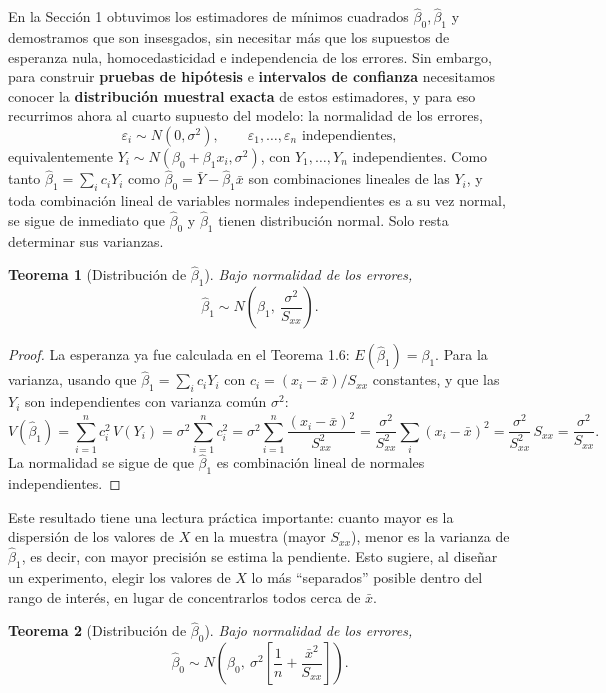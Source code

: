 \documentclass[11pt,a4paper]{article}
\theoremstyle{plain}
\newtheorem{teorema}{Teorema}[section]
\theoremstyle{definition}
\theoremstyle{remark}
\begin{document}
En la Sección 1 obtuvimos los estimadores de mínimos cuadrados $\hat\beta_0,\hat\beta_1$ y demostramos que son insesgados, sin necesitar más que los supuestos de esperanza nula, homocedasticidad e independencia de los errores. Sin embargo, para construir \textbf{pruebas de hipótesis} e \textbf{intervalos de confianza} necesitamos conocer la \textbf{distribución muestral exacta} de estos estimadores, y para eso recurrimos ahora al cuarto supuesto del modelo: la normalidad de los errores,
\[
\varepsilon_i \sim N(0,\sigma^2), \qquad \varepsilon_1,\dots,\varepsilon_n \text{ independientes},
\]
equivalentemente $Y_i\sim N(\beta_0+\beta_1x_i,\sigma^2)$, con $Y_1,\dots,Y_n$ independientes. Como tanto $\hat\beta_1=\sum_ic_iY_i$ como $\hat\beta_0=\bar Y-\hat\beta_1\bar x$ son combinaciones lineales de las $Y_i$, y toda combinación lineal de variables normales independientes es a su vez normal, se sigue de inmediato que $\hat\beta_0$ y $\hat\beta_1$ tienen distribución normal. Solo resta determinar sus varianzas.

\begin{teorema}[Distribución de $\hat\beta_1$]
Bajo normalidad de los errores,
\[
\hat\beta_1 \sim N\left(\beta_1,\ \frac{\sigma^2}{S_{xx}}\right).
\]
\end{teorema}

\begin{proof}
La esperanza ya fue calculada en el Teorema 1.6: $E(\hat\beta_1)=\beta_1$. Para la varianza, usando que $\hat\beta_1=\sum_ic_iY_i$ con $c_i=(x_i-\bar x)/S_{xx}$ constantes, y que las $Y_i$ son independientes con varianza común $\sigma^2$:
\[
V(\hat\beta_1) = \sum_{i=1}^n c_i^2\, V(Y_i) = \sigma^2\sum_{i=1}^n c_i^2 = \sigma^2\sum_{i=1}^n \frac{(x_i-\bar x)^2}{S_{xx}^2} = \frac{\sigma^2}{S_{xx}^2}\sum_i(x_i-\bar x)^2 = \frac{\sigma^2}{S_{xx}^2}\,S_{xx} = \frac{\sigma^2}{S_{xx}}.
\]
La normalidad se sigue de que $\hat\beta_1$ es combinación lineal de normales independientes.
\end{proof}

Este resultado tiene una lectura práctica importante: cuanto mayor es la dispersión de los valores de $X$ en la muestra (mayor $S_{xx}$), menor es la varianza de $\hat\beta_1$, es decir, con mayor precisión se estima la pendiente. Esto sugiere, al diseñar un experimento, elegir los valores de $X$ lo más ``separados'' posible dentro del rango de interés, en lugar de concentrarlos todos cerca de $\bar x$.

\begin{teorema}[Distribución de $\hat\beta_0$]
Bajo normalidad de los errores,
\[
\hat\beta_0 \sim N\left(\beta_0,\ \sigma^2\left[\frac1n+\frac{\bar x^2}{S_{xx}}\right]\right).
\]
\end{teorema}
\end{document}
